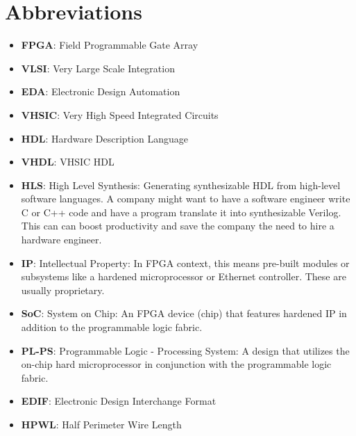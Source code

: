 \documentclass{article}
\begin{document}
\section{Abbreviations}
\begin{itemize}[label={--}, left=0.25cm]
    \item \textbf{FPGA}: Field Programmable Gate Array
    \item \textbf{VLSI}: Very Large Scale Integration
    \item \textbf{EDA}: Electronic Design Automation
    \item \textbf{VHSIC}: Very High Speed Integrated Circuits
    \item \textbf{HDL}: Hardware Description Language
    \item \textbf{VHDL}: VHSIC HDL
    \item \textbf{HLS}: High Level Synthesis: Generating synthesizable HDL from high-level software languages. A company might want to have a software engineer write C or C++ code and have a program translate it into synthesizable Verilog. This can can boost productivity and save the company the need to hire a hardware engineer.
    \item \textbf{IP}: Intellectual Property: In FPGA context, this means pre-built modules or subsystems like a hardened microprocessor or Ethernet controller. These are usually proprietary.
    \item \textbf{SoC}: System on Chip: An FPGA device (chip) that features hardened IP in addition to the programmable logic fabric.
    \item \textbf{PL-PS}: Programmable Logic - Processing System: A design that utilizes the on-chip hard microprocessor in conjunction with the programmable logic fabric.
    \item \textbf{EDIF}: Electronic Design Interchange Format
    \item \textbf{HPWL}: Half Perimeter Wire Length
\end{itemize}
\end{document}
